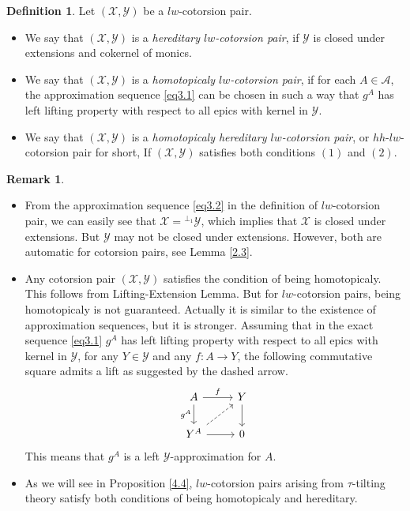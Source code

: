 \documentclass[12pt]{amsart}
\numberwithin{equation}{section}
\theoremstyle{definition}
\newtheorem{remark}[lemma]{Remark}
\newtheorem{definition}[lemma]{Definition}
\newtheorem*{theorem 0*}{Theorem}
\newtheorem*{theorem a*}{Theorem A}
\newtheorem*{theorem b*}{Theorem B}
\numberwithin{diagram}{section}
\begin{document}
\begin{definition}\label{3.6}
Let $(\mathcal{X},\mathcal{Y})$ be a $lw$-cotorsion pair.
\begin{itemize}
\item[(1)]
We say that $(\mathcal{X},\mathcal{Y})$ is a {\it hereditary $lw$-cotorsion pair}, if $\mathcal{Y}$ is closed under extensions and cokernel of monics.
\item[(2)]
We say that $(\mathcal{X},\mathcal{Y})$ is a {\it homotopicaly $lw$-cotorsion pair}, if for each $A\in\mathcal{A}$, the approximation sequence \eqref{eq3.1} can be chosen in such a way that $g^A$ has left lifting property with respect to all epics with kernel in $\mathcal{Y}$.
\item[(3)]
We say that $(\mathcal{X},\mathcal{Y})$ is a {\it homotopicaly hereditary $lw$-cotorsion pair}, or $hh$-$lw$-cotorsion pair for short, If $(\mathcal{X},\mathcal{Y})$ satisfies both conditions $(1)$ and $(2)$.
\end{itemize}
\end{definition}

\begin{remark}\label{3.7}
\begin{itemize}
\item[(1)]
From the approximation sequence \eqref{eq3.2} in the definition of $lw$-cotorsion pair, we can easily see that $\mathcal{X}={}^{\perp_1}\mathcal{Y}$, which implies that $\mathcal{X}$ is closed under extensions. But $\mathcal{Y}$ may not be closed under extensions.
However, both are automatic for cotorsion pairs, see Lemma \ref{2.3}.
\item[(2)]
Any cotorsion pair $(\mathcal{X},\mathcal{Y})$ satisfies the condition of being homotopicaly. This follows from Lifting-Extension Lemma.
But for $lw$-cotorsion pairs, being homotopicaly is not guaranteed.
Actually it is similar to the existence of approximation sequences, but it is stronger.
Assuming that in the exact sequence \eqref{eq3.1} $g^A$ has left lifting property with respect to all epics with kernel in $\mathcal{Y}$, for any $Y\in\mathcal{Y}$ and any $f:A\rightarrow Y$, the following commutative square admits a lift as suggested by the dashed arrow.
\[\begin{tikzcd}
A & Y \\
{Y^A} & 0
\arrow["f", from=1-1, to=1-2]
\arrow["{g^A}"', from=1-1, to=2-1]
\arrow[from=1-2, to=2-2]
\arrow[dashed, from=2-1, to=1-2]
\arrow[from=2-1, to=2-2]
\end{tikzcd}\]
This means that $g^A$ is a left $\mathcal{Y}$-approximation for $A$.
\item[(3)]
As we will see in Proposition \ref{4.4}, $lw$-cotorsion pairs arising from $\tau$-tilting theory satisfy both conditions of being homotopicaly and hereditary.
\end{itemize}
\end{remark}
\end{document}

